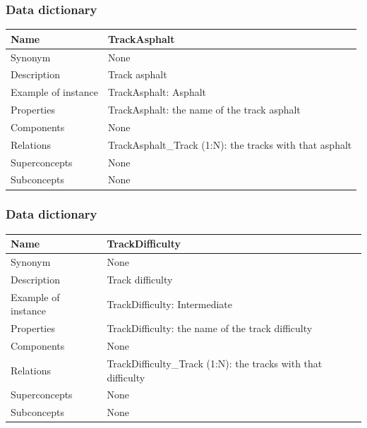 \documentclass{beamer}
\begin{document}
\begin{frame}
    \frametitle{Data dictionary}
    \begin{table}
    \tiny
    \begin{tabular}{|p{2cm}|p{6cm}|}
    \hline
    Name & \textbf{TrackAsphalt} \\
    \hline
    Synonym & None \\
    \hline
    Description & Track asphalt \\
    \hline
    Example of instance &
    TrackAsphalt: Asphalt \\
    \hline
    Properties &
    TrackAsphalt: the name of the track asphalt \\
    \hline
    Components & None \\
    \hline
    Relations &
    TrackAsphalt\_Track (1:N): the tracks with that asphalt \\
    \hline
    Superconcepts & None \\
    \hline
    Subconcepts & None \\
    \hline
    \end{tabular}
    \end{table}
\end{frame}


\begin{frame}
    \frametitle{Data dictionary}
    \begin{table}
    \tiny
    \begin{tabular}{|p{2cm}|p{6cm}|}
    \hline
    Name & \textbf{TrackDifficulty} \\
    \hline
    Synonym & None \\
    \hline
    Description & Track difficulty \\
    \hline
    Example of instance &
    TrackDifficulty: Intermediate \\
    \hline
    Properties &
    TrackDifficulty: the name of the track difficulty \\
    \hline
    Components & None \\
    \hline
    Relations &
    TrackDifficulty\_Track (1:N): the tracks with that difficulty \\
    \hline
    Superconcepts & None \\
    \hline
    Subconcepts & None \\
    \hline
    \end{tabular}
    \end{table}
\end{frame}
\end{document}
